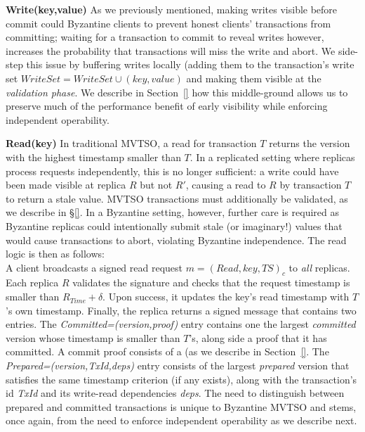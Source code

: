 \par \textbf{Write(key,value)} As we previously mentioned, making writes visible before commit could Byzantine clients to prevent honest clients' transactions from committing; waiting for a transaction to commit to reveal writes however, increases the probability that transactions will miss the write and abort.  We side-step this issue by buffering writes locally (adding them to the transaction's write set $WriteSet = WriteSet \cup(key,value)$ and making them visible at the \textit{validation phase}. We describe in Section~\ref{}
how this middle-ground allows us to preserve
much of the performance benefit of early visibility while enforcing independent operability.

\par \textbf{Read(key)} In traditional MVTSO, a read for transaction $T$ returns the version with the highest timestamp smaller than $T$. In a replicated setting where replicas process requests independently, this is no longer sufficient: a write could have been made visible at replica $R$ but not $R'$, causing a read to $R$ by transaction $T$ to return a stale value. MVTSO transactions must additionally be validated, as we describe in \S\ref{}. In a Byzantine
setting, however, further care is required as Byzantine replicas could intentionally submit stale (or imaginary!) values that would cause transactions to abort, violating Byzantine independence. The read logic is then as follows:
\\
A client broadcasts a signed read request  $m = (Read, key, TS)_c$ to \textit{all} replicas.
\\
Each replica $R$ validates the signature and checks that the request timestamp is smaller than $R_{Time} + \delta$. Upon success, it updates the key's read timestamp with $T$'s own timestamp. Finally, the replica returns a signed message  that contains two entries.
The \textit{Committed=(version,proof)} entry contains one the largest \textit{committed} version whose timestamp is smaller than $T$'s, along side a proof that it has committed. A commit proof consists of a (as we describe in Section~\ref{}. The \textit{Prepared=(version,TxId,deps)} entry consists of the largest \textit{prepared} version that satisfies the same timestamp criterion (if any exists), along with the transaction's id \textit{TxId} and its write-read dependencies \textit{deps}.
The need to distinguish between prepared and committed transactions is unique to Byzantine MVTSO and stems, once again, from the need to enforce independent operability as we describe next.

